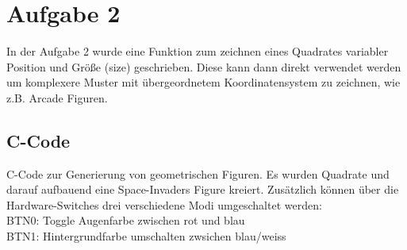 \section{Aufgabe 2} \label{ex2}
In der Aufgabe 2 wurde eine Funktion zum zeichnen eines Quadrates variabler Position und Größe (size) geschrieben. Diese kann 
dann direkt verwendet werden um komplexere Muster mit übergeordnetem Koordinatensystem zu zeichnen, wie z.B. Arcade Figuren.

\subsection{C-Code}
C-Code zur Generierung von geometrischen Figuren. Es wurden Quadrate und darauf aufbauend eine Space-Invaders 
Figure kreiert. Zusätzlich können über die Hardware-Switches drei verschiedene Modi umgeschaltet werden:\\
BTN0: Toggle Augenfarbe zwischen rot und blau\\
BTN1: Hintergrundfarbe umschalten zwsichen blau/weiss\\

